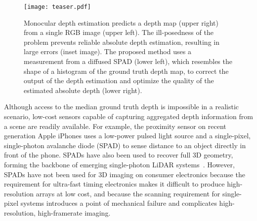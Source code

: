 

\begin{figure}
  \texttt{[image: teaser.pdf]}
  \caption{Monocular depth estimation predicts a depth map (upper right) from a single RGB image (upper left). The ill-posedness of the problem prevents reliable absolute depth estimation, resulting in large errors (inset image). The proposed method uses a measurement from a diffused SPAD (lower left), which resembles the shape of a histogram of the ground truth depth map, to correct the output of the depth estimation and optimize the quality of the estimated absolute depth (lower right).}
  \label{fig:teaser}
\end{figure}

Although access to the median ground truth depth is impossible in a realistic scenario, low-cost sensors capable of capturing aggregated depth information from a scene are readily available. For example, the proximity sensor on recent generation Apple iPhones uses a low-power pulsed light source and a single-pixel, single-photon avalanche diode (SPAD) to sense distance to an object directly in front of the phone. SPADs have also been used to recover full 3D geometry, forming the backbone of emerging single-photon LiDAR systems~\cite{Kirmani:2014,Li:2019,pawlikowska2017single}. However, SPADs have not been used for 3D imaging on consumer electronics because the requirement for ultra-fast timing electronics makes it difficult to produce high-resolution arrays at low cost, and because the scanning requirement for single-pixel systems introduces a point of mechanical failure and complicates high-resolution, high-framerate imaging. 

